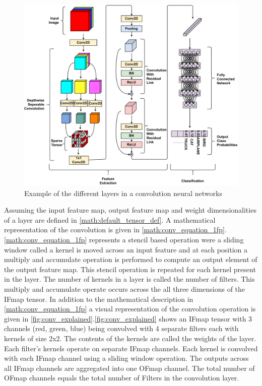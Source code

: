 
\begin{figure}[ht]
    \centering
    \includegraphics[scale=0.4]{fig/cnn.pdf}
    \caption{Example of the different layers in a convolution neural networks}
    \label{fig:cnn_network}
\end{figure}


Assuming the input feature map, output feature map and weight dimensionalities
of a layer are defined in \autoref{math:default_tensor_def}. A mathematical
representation of the convolution is given in \autoref{math:conv_equation_1fp}.
\autoref{math:conv_equation_1fp} represents a stencil based operation were a
sliding window called a kernel is moved across an input feature and at each
position a multiply and accumulate operation is performed to compute an output
element of the output feature map. This stencil operation is repeated for each
kernel present in the layer. The number of kernels in a layer is called the
number of filters. This multiply and accumulate operate occurs across the all
three dimensions of the IFmap tensor. In addition to the mathematical
description in \autoref{math:conv_equation_1fp} a visual representation of the
convolution operation is given in
\autoref{fig:conv_explained}.\autoref{fig:conv_explained} shows an IFmap tensor
with 3 channels (red, green, blue) being convolved with 4 separate filters each
with kernels of size 2x2. The contents of the kernels are called the weights of
the layer. Each filter's kernels operate on separate IFmap
channels. Each kernel is convolved with each IFmap channel using a sliding
window operation. The outputs across all IFmap channels are aggregated into one
OFmap channel. The total number of OFmap channels equals the total number of
Filters in the convolution layer. 

